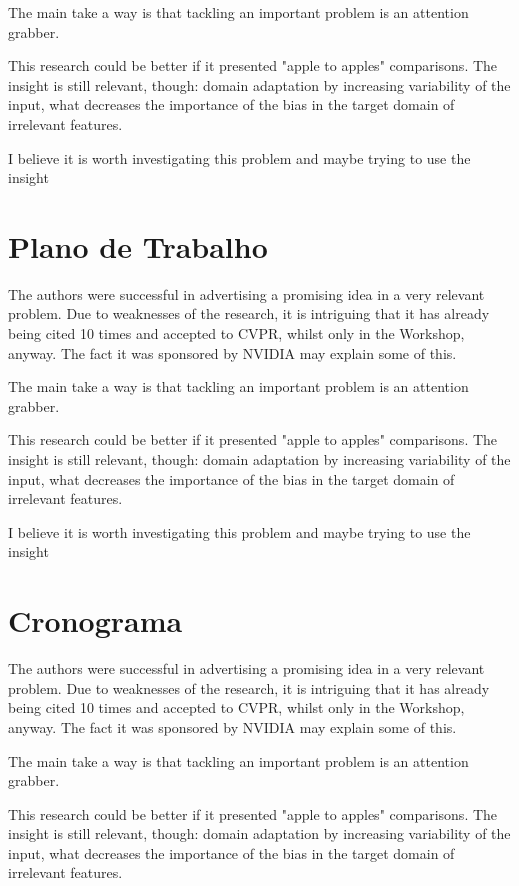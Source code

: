 \documentclass[
12pt, %
a4paper, %
onecolumn, %
]{article}
\begin{document}
The main take a way is that tackling an important problem is an attention grabber. 

This research could be better if it presented "apple to apples" comparisons. The insight is still relevant, though: domain adaptation by increasing variability of the input, what decreases the importance of the bias in the target domain of irrelevant features.

I believe it is worth investigating this problem and maybe trying to use the insight


\section{Plano de Trabalho}

The authors were successful in advertising a promising idea in a very relevant problem.  Due to weaknesses of the research, it is intriguing that it has already being cited 10 times and accepted to CVPR, whilst only in the Workshop, anyway. The fact it was sponsored by NVIDIA may explain some of this.

The main take a way is that tackling an important problem is an attention grabber. 

This research could be better if it presented "apple to apples" comparisons. The insight is still relevant, though: domain adaptation by increasing variability of the input, what decreases the importance of the bias in the target domain of irrelevant features.

I believe it is worth investigating this problem and maybe trying to use the insight


\section{Cronograma}

The authors were successful in advertising a promising idea in a very relevant problem.  Due to weaknesses of the research, it is intriguing that it has already being cited 10 times and accepted to CVPR, whilst only in the Workshop, anyway. The fact it was sponsored by NVIDIA may explain some of this.

The main take a way is that tackling an important problem is an attention grabber. 

This research could be better if it presented "apple to apples" comparisons. The insight is still relevant, though: domain adaptation by increasing variability of the input, what decreases the importance of the bias in the target domain of irrelevant features.
\end{document}
